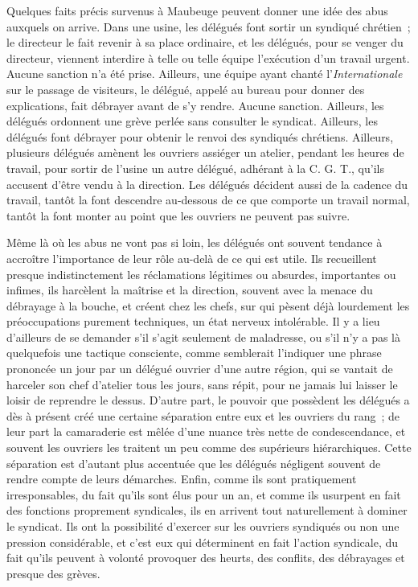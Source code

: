 \documentclass[french,twoside]{book} %
\begin{document}
Quelques faits précis survenus à Maubeuge peuvent donner une idée des abus auxquels on arrive. Dans une usine, les délégués font sortir un syndiqué chrétien ; le directeur le fait revenir à sa place ordinaire, et les délégués, pour se venger du directeur, viennent interdire à telle ou telle équipe l'exécution d'un travail urgent. Aucune sanction n'a été prise. Ailleurs, une équipe ayant chanté l'{\itshape Internationale} sur le passage de visiteurs, le délégué, appelé au bureau pour donner des explications, fait débrayer avant de s'y rendre. Aucune sanction. Ailleurs, les délégués ordonnent une grève perlée sans consulter le syndicat. Ailleurs, les délégués font débrayer pour obtenir le renvoi des syndiqués chrétiens. Ailleurs, plusieurs délégués amènent les ouvriers assiéger un atelier, pendant les heures de travail, pour sortir de l'usine un autre délégué, adhérant à la C. G. T., qu'ils accusent d'être vendu à la direction. Les délégués décident aussi de la cadence du travail, tantôt la font descendre au-dessous de ce que comporte un travail normal, tantôt la font monter au point que les ouvriers ne peuvent pas suivre.\par
Même là où les abus ne vont pas si loin, les délégués ont souvent tendance à accroître l'importance de leur rôle au-delà de ce qui est utile. Ils recueillent presque indistinctement les réclamations légitimes ou absurdes, importantes ou infimes, ils harcèlent la maîtrise et la direction, souvent avec la menace du débrayage à la bouche, et créent chez les chefs, sur qui pèsent déjà lourdement les préoccupations purement techniques, un état nerveux intolérable. Il y a lieu d'ailleurs de se demander s'il s'agit seulement de maladresse, ou s'il n'y a pas là quelquefois une tactique consciente, comme semblerait l'indiquer une phrase prononcée un jour par un délégué ouvrier d'une autre région, qui se vantait de harceler son chef d'atelier tous les jours, sans répit, pour ne jamais lui laisser le loisir de reprendre le dessus. D'autre part, le pouvoir que possèdent les délégués a dès à présent créé une certaine séparation entre eux et les ouvriers du rang ; de leur part la camaraderie est mêlée d'une nuance très nette de condescendance, et souvent les ouvriers les traitent un peu comme des supérieurs hiérarchiques. Cette séparation est d'autant plus accentuée que les délégués négligent souvent de rendre compte de leurs démarches. Enfin, comme ils sont pratiquement irresponsables, du fait qu'ils sont élus pour un an, et comme ils usurpent en fait des fonctions proprement syndicales, ils en arrivent tout naturellement à dominer le syndicat. Ils ont la possibilité d'exercer sur les ouvriers syndiqués ou non une pression considérable, et c'est eux qui déterminent en fait l'action syndicale, du fait qu'ils peuvent à volonté provoquer des heurts, des conflits, des débrayages et presque des grèves.
\end{document}

